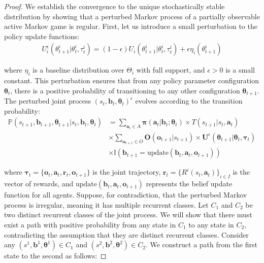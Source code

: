 \begin{proof}
    We establish the convergence to the unique stochastically stable distribution by
    showing that a perturbed Markov process of a partially observable active Markov
    game is regular. First, let us introduce a small perturbation to the policy update
    functions:
    \begin{align}
        U^{\epsilon}_{i}(\theta^{i}_{t+1}|\theta^{i}_{t}, \tau^{i}_{t}) = (1 - \epsilon) U_{i}(\theta^{i}_{t+1}|\theta^{i}_{t}, \tau^{i}_{t}) + \epsilon \eta_{i}(\theta^{i}_{t+1})
    \end{align}

    where $\eta_{i}$ is a baseline distribution over $\Theta_{i}$ with full support,
    and $\epsilon > 0$ is a small constant. This perturbation ensures that from any
    policy parameter configuration $\boldsymbol{\theta}_{t}$, there is a positive
    probability of transitioning to any other configuration
    $\boldsymbol{\theta}_{t+1}$. The perturbed joint process $(s_{t}, \boldsymbol{b}
        _{t}, \boldsymbol{\theta}_{t})^{\epsilon}$ evolves according to the transition
    probability:
    \begin{align}
        \mathbb{P}(s_{t+1}, \boldsymbol{b}_{t+1}, \boldsymbol{\theta}_{t+1}|s_{t}, \boldsymbol{b}_{t}, \boldsymbol{\theta}_{t}) & = \sum_{\boldsymbol{a}_t \in A}\boldsymbol{\pi}(\boldsymbol{a}_{t}|\boldsymbol{b}_{t}; \boldsymbol{\theta}_{t}) \times T(s_{t+1}|s_{t}, \boldsymbol{a}_{t})                                     \\
                                                                                                                                & \times \sum_{\boldsymbol{o}_{t+1} \in O}\boldsymbol{O}(\boldsymbol{o}_{t+1}|s_{t+1}) \times \boldsymbol{U}^{\epsilon}(\boldsymbol{\theta}_{t+1}|\boldsymbol{\theta}_{t}, \boldsymbol{\tau}_{t}) \\
                                                                                                                                & \times \mathbb{I}(\boldsymbol{b}_{t+1}= \text{update}(\boldsymbol{b}_{t}, \boldsymbol{a}_{t}, \boldsymbol{o}_{t+1}))
    \end{align}

    where $\boldsymbol{\tau}_{t} = \{\boldsymbol{o}_{t}, \boldsymbol{a}_{t}, \boldsymbol
        {r}_{t}, \boldsymbol{o}_{t+1}\}$ is the joint trajectory,
    $\boldsymbol{r}_{t} = \{R^{i}(s_{t}, \boldsymbol{a}_{t})\}_{i \in I}$ is the
    vector of rewards, and $\text{update}(\boldsymbol{b}_{t}, \boldsymbol{a}_{t}, \boldsymbol
        {o}_{t+1})$ represents the belief update function for all agents. Suppose, for
    contradiction, that the perturbed Markov process is irregular, meaning it has multiple
    recurrent classes. Let $C_{1}$ and $C_{2}$ be two distinct recurrent classes
    of the joint process. We will show that there must exist a path with positive probability
    from any state in $C_{1}$ to any state in $C_{2}$, contradicting the
    assumption that they are distinct recurrent classes. Consider any $(s^{1}, \boldsymbol
        {b}^{1}, \boldsymbol{\theta}^{1}) \in C_{1}$ and $(s^{2}, \boldsymbol{b}^{2}, \boldsymbol
        {\theta}^{2}) \in C_{2}$. We construct a path from the first state to the
    second as follows:


\end{proof}
